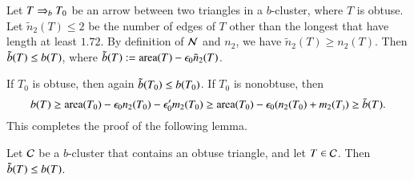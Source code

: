 Let $T\Rightarrow_{b} T_0$ be an arrow between two triangles in a $b$-cluster, where $T$ is obtuse.
Let $\tilde n_2(T)\le 2$ be the number of edges of $T$ other than the longest that
have length at least $1.72$.  By definition of $\mathcal N$ and $n_2$, we have $\tilde n_2(T)\ge n_2(T)$.
Then $\tilde b(T) \le b(T)$, where $\tilde b(T) := {\operatorname{area}}(T)-\epsilon_0\tilde n_2(T)$.

If $T_0$ is obtuse, then again $\tilde b(T_0)\le b(T_0)$.
If $T_0$ is nonobtuse, then
\[
b(T) \ge {\operatorname{area}}(T_0) - \epsilon_0 n_2(T_0) - \epsilon_0' m_2(T_0) \ge {\operatorname{area}}(T_0) - \epsilon_0 (n_2(T_0)+m_2(T_)) \ge \tilde b(T).
\]
This completes the proof of the following lemma.

\begin{lemma} Let $\mathcal C$ be  a $b$-cluster that contains an obtuse triangle, and
let $T\in \mathcal C$.  Then  $\tilde b(T)\le b(T)$.
\end{lemma}






